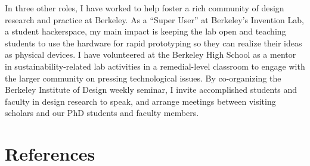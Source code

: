 \documentclass[12pt]{memoir}
\begin{document}
In three other roles, I have worked to help foster a rich community of design research and practice at Berkeley.
As a ``Super User'' at Berkeley's Invention Lab, a student hackerspace, my main impact is keeping the lab open and teaching students to use the hardware for rapid prototyping so they can realize their ideas as physical devices.
I have volunteered at the Berkeley High School as a mentor in sustainability-related lab activities in a remedial-level classroom to engage with the larger community on pressing technological issues.
By co-organizing the Berkeley Institute of Design weekly seminar, I invite accomplished students and faculty in design research to speak, and arrange meetings between visiting scholars and our PhD students and faculty members.

\section{References}
\printbibliography[heading=none]
\end{document}
